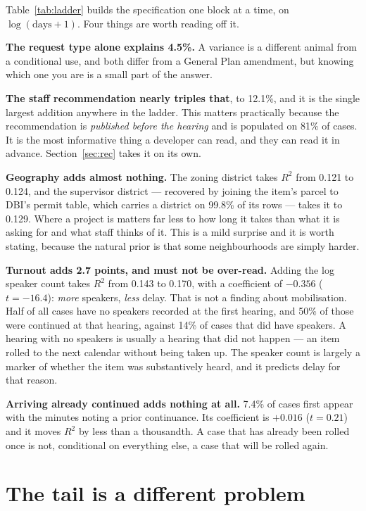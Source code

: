 \documentclass[11pt]{article}
\begin{document}
Table~\ref{tab:ladder} builds the specification one block at a time, on $\log(\text{days}+1)$.
Four things are worth reading off it.

\textbf{The request type alone explains 4.5\%.} A variance is a different animal from a
conditional use, and both differ from a General Plan amendment, but knowing which one you are
is a small part of the answer.

\textbf{The staff recommendation nearly triples that}, to 12.1\%, and it is the single largest
addition anywhere in the ladder. This matters practically because the recommendation is
\emph{published before the hearing} and is populated on 81\% of cases. It is the most
informative thing a developer can read, and they can read it in advance. Section~\ref{sec:rec}
takes it on its own.

\textbf{Geography adds almost nothing.} The zoning district takes $R^2$ from 0.121 to 0.124,
and the supervisor district --- recovered by joining the item's parcel to DBI's permit table,
which carries a district on 99.8\% of its rows --- takes it to 0.129. Where a project is
matters far less to how long it takes than what it is asking for and what staff thinks of it.
This is a mild surprise and it is worth stating, because the natural prior is that some
neighbourhoods are simply harder.

\textbf{Turnout adds 2.7 points, and must not be over-read.} Adding the log speaker count
takes $R^2$ from 0.143 to 0.170, with a coefficient of $-0.356$ ($t=-16.4$): \emph{more}
speakers, \emph{less} delay. That is not a finding about mobilisation. Half of all cases have
no speakers recorded at the first hearing, and 50\% of those were continued at that hearing,
against 14\% of cases that did have speakers. A hearing with no speakers is usually a hearing
that did not happen --- an item rolled to the next calendar without being taken up. The
speaker count is largely a marker of whether the item was substantively heard, and it predicts
delay for that reason.

\textbf{Arriving already continued adds nothing at all.} 7.4\% of cases first appear with the
minutes noting a prior continuance. Its coefficient is $+0.016$ ($t=0.21$) and it moves $R^2$
by less than a thousandth. A case that has already been rolled once is not, conditional on
everything else, a case that will be rolled again.

\section{The tail is a different problem}
\end{document}
